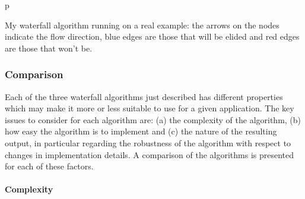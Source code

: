 \begin{stusubfig}{p}
	\hspace{4mm}%
\caption{My waterfall algorithm running on a real example: the arrows on the nodes indicate the flow direction, blue edges are those that will be elided and red edges are those that won't be.}
\label{fig:segmentation-waterfall-smg-example}
\end{stusubfig}

\subsubsection{Comparison}
\label{subsubsec:segmentation-waterfall-comparison}

Each of the three waterfall algorithms just described has different properties which may make it more or less suitable to use for a given application. The key issues to consider for each algorithm are: (a) the complexity of the algorithm, (b) how easy the algorithm is to implement and (c) the nature of the resulting output, in particular regarding the robustness of the algorithm with respect to changes in implementation details. A comparison of the algorithms is presented for each of these factors.

\paragraph{Complexity}

